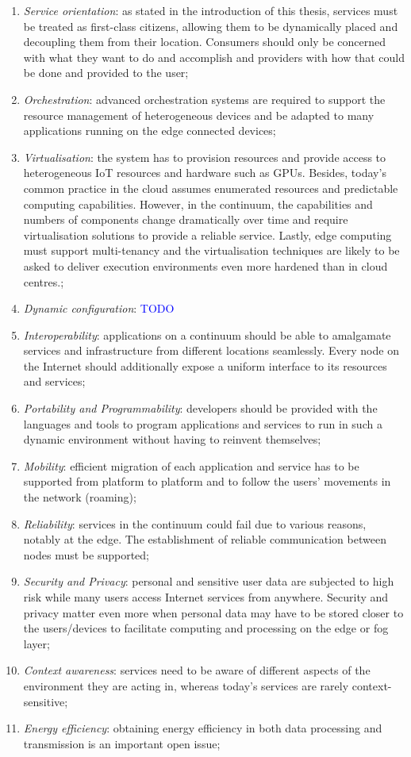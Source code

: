 \documentclass{ieeeaccess}
\begin{document}
\label{challenges}

\begin{enumerate}
    \item \emph{Service orientation}: as stated in the introduction of this thesis, services must be treated as first-class citizens, allowing them to be dynamically placed and decoupling them from their location. Consumers should only be concerned with what they want to do and accomplish and providers with how that could be done and provided to the user;
    \item \emph{Orchestration}: advanced orchestration systems are required to support the resource management of heterogeneous devices and be adapted to many applications running on the edge connected devices;
    \item \emph{Virtualisation}: the system has to provision resources and provide access to heterogeneous IoT resources and hardware such as GPUs. Besides, today's common practice in the cloud assumes enumerated resources and predictable computing capabilities. However, in the continuum, the capabilities and numbers of components change dramatically over time and require virtualisation solutions to provide a reliable service. Lastly, edge computing must support multi-tenancy and the virtualisation techniques are likely to be asked to deliver execution environments even more hardened than in cloud centres.;
    \item \emph{Dynamic configuration}: \textcolor{blue}{TODO}
    \item \emph{Interoperability}: applications on a continuum should be able to amalgamate services and infrastructure from different locations seamlessly. Every node on the Internet should additionally expose a uniform interface to its resources and services;
    \item \emph{Portability and Programmability}: developers should be provided with the languages and tools to program applications and services to run in such a dynamic environment without having to reinvent themselves;
    \item \emph{Mobility}: efficient migration of each application and service has to be supported from platform to platform and to follow the users' movements in the network (roaming);
    \item \emph{Reliability}: services in the continuum could fail due to various reasons, notably at the edge. The establishment of reliable communication between nodes must be supported;
    \item \emph{Security and Privacy}: personal and sensitive user data are subjected to high risk while many users access Internet services from anywhere. Security and privacy matter even more when personal data may have to be stored closer to the users/devices to facilitate computing and processing on the edge or fog layer;
    \item \emph{Context awareness}: services need to be aware of different aspects of the environment they are acting in, whereas today's services are rarely context-sensitive;
    \item \emph{Energy efficiency}: obtaining energy efficiency in both data processing and transmission is an important open issue;
\end{enumerate}
\end{document}
